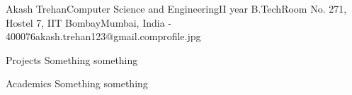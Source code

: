 \documentclass{resume_ssl}
\begin{document}
\begin{Header}{Akash Trehan}{Computer Science and Engineering}{II year B.Tech}{Room No. 271, Hostel 7, IIT Bombay}{Mumbai, India - 400076}{akash.trehan123@gmail.com}{profile.jpg}
\end{Header}

\begin{Section}{Projects}
Something something
\end{Section}

\begin{Section}{Academics}
Something something
\end{Section}
\end{document}
